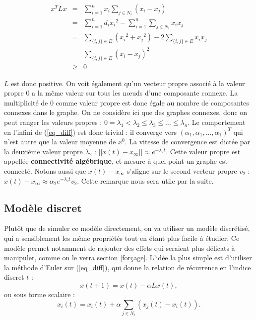 \documentclass[12pt]{article}
\begin{document}
\begin{eqnarray*}
 x^T L x & = & \sum_{i = 1}^n x_i \sum_{j \in N_i} (x_i - x_j) \\
 & = & \sum_{i = 1}^n d_i {x_i}^2 - \sum_{i = 1}^n \sum_{j \in N_i} x_i x_j \\
 & = & \sum_{\{i, j\} \in E} ({x_i}^2 + {x_j}^2) - 2 \sum_{\{i, j\} \in E} x_i x_j \\
 & = & \sum_{\{i, j\} \in E} (x_i - x_j)^2 \\
 & \geq & 0
\end{eqnarray*}

$L$ est donc positive. On voit également qu'un vecteur propre associé
à la valeur propre $0$ a la même valeur sur tous les n\oe uds d'une
composante connexe. La multiplicité de $0$ comme valeur propre est
donc égale au nombre de composantes connexes dans le graphe. On ne
considère ici que des graphes connexes, donc on peut ranger les
valeurs propres : $0 = \lambda_1 < \lambda_2 \leq \lambda_3 \leq \dots
\leq \lambda_n$. Le comportement en l'infini de (\ref{eq_diff}) est
donc trivial : il converge vers $(\alpha_1, \alpha_1, \dots,
\alpha_1)^T$ qui n'est autre que la valeur moyenne de $x^0$. La
vitesse de convergence est dictée par la deuxième valeur propre
$\lambda_2$ : $||x(t) - x_\infty|| \approx e^{-\lambda_2 t}$. Cette
valeur propre est appellée {\bf connectivité algébrique}, et mesure à
quel point un graphe est connecté. Notons aussi que $x(t) - x_\infty$
s'aligne sur le second vecteur propre $v_2$ : $x(t) - x_\infty \approx
\alpha_2 e^{-\lambda_2 t} v_2$. Cette remarque nous sera utile par la
suite.

\subsection{Modèle discret}
\label{mod_discret}
Plutôt que de simuler ce modèle directement, on va utiliser un modèle
discrétisé, qui a sensiblement les même propriétés tout en étant plus
facile à étudier. Ce modèle permet notamment de rajouter des effets
qui seraient plus délicats à manipuler, comme on le verra section
\ref{forçage}. L'idée la plus simple est d'utiliser la méthode d'Euler
sur (\ref{eq_diff}), qui donne la relation de récurrence en l'indice
discret $t$ :
\begin{equation}
 \label{eq_discrete}
 x(t+1) = x(t) - \alpha L x(t),
\end{equation}
ou sous forme scalaire :
\begin{equation}
 \label{eq_discrete_scal}
 x_i(t) = x_i(t) + \alpha \sum_{j \in N_i} (x_j(t) - x_i(t)).
\end{equation}
\end{document}
